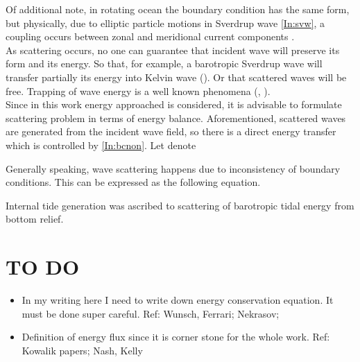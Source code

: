 Of additional note, in rotating ocean the boundary condition has the same form, but physically, due to elliptic particle motions in Sverdrup wave \eqref{In:svw}, a coupling occurs between zonal and meridional current components \cite{greenspan1968theory}.\\
As scattering occurs, no one can guarantee that incident wave will preserve its form and its energy. So that, for example, a barotropic Sverdrup wave will transfer partially its energy into Kelvin wave (\cite{pinsent1972kelvin}). Or that scattered waves will be free. Trapping of wave energy is a well known phenomena (\cite{longuet1967trapping}, \cite{kowalik2002tidal}).\\
Since in this work energy approached is considered, it is advisable to formulate scattering problem in terms of energy balance. Aforementioned, scattered waves are generated from the incident wave field, so there is a direct energy transfer which is controlled by \eqref{In:bcnon}. Let denote 

Generally speaking, wave scattering happens due to inconsistency of boundary conditions. This can be expressed as the following equation.

Internal tide generation was ascribed to scattering of barotropic tidal energy from bottom relief.

\newpage
\section{TO DO}
\begin{itemize}
\item In my writing here I need to write down energy conservation equation. It must be done super careful. Ref: Wunsch, Ferrari; Nekrasov; 
\item Definition of energy flux since it is corner stone for the whole work. Ref: Kowalik papers; Nash, Kelly

\end{itemize}




